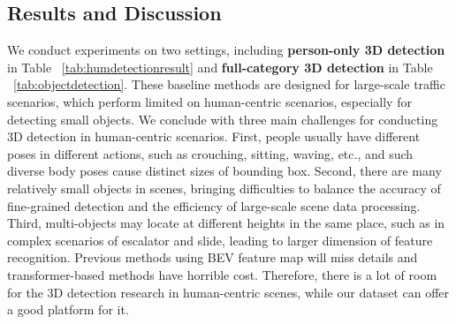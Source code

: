 \subsection{Results and Discussion}

We conduct experiments on two settings, including \textbf{person-only 3D detection} in Table ~\ref{tab:humdetectionresult} and  \textbf{full-category 3D detection} in Table ~\ref{tab:objectdetection}. These baseline methods are designed for large-scale traffic scenarios, which perform limited on human-centric scenarios, especially for detecting small objects. We conclude with three main challenges for conducting 3D detection in human-centric scenarios. First, people usually have different poses in different actions, such as crouching, sitting, waving, etc., and such diverse body poses cause distinct sizes of bounding box. Second, there are many relatively small objects in scenes, bringing difficulties to balance the accuracy of fine-grained detection and the efficiency of large-scale scene data processing. Third, multi-objects may locate at different heights in the same place, such as in complex scenarios of escalator and slide, leading to larger dimension of feature recognition. Previous methods using BEV feature map will miss details and transformer-based methods have horrible cost. Therefore, there is a lot of room for the 3D detection research in human-centric scenes, while our dataset can offer a good platform for it.






